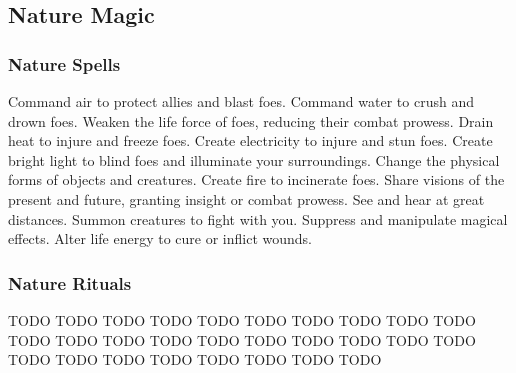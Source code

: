 \small
\subsection{Nature Magic}\label{Nature Magic}
\subsubsection{Nature Spells}\label{Nature Spells}
\begin{spelllist}
 Command air to protect allies and blast foes.
 Command water to crush and drown foes.
 Weaken the life force of foes, reducing their combat prowess.
 Drain heat to injure and freeze foes.
 Create electricity to injure and stun foes.
 Create bright light to blind foes and illuminate your surroundings.
 Change the physical forms of objects and creatures.
 Create fire to incinerate foes.
 Share visions of the present and future, granting insight or combat prowess.
 See and hear at great distances.
 Summon creatures to fight with you.
 Suppress and manipulate magical effects.
 Alter life energy to cure or inflict wounds.
\end{spelllist}

\subsubsection{Nature Rituals}\label{Nature Rituals}
\begin{spelllist}
 TODO
 TODO
 TODO
 TODO
 TODO
 TODO
 TODO
 TODO
 TODO
 TODO
 TODO
 TODO
 TODO
 TODO
 TODO
 TODO
 TODO
 TODO
 TODO
 TODO
 TODO
 TODO
 TODO
 TODO
 TODO
 TODO
 TODO
 TODO
\end{spelllist}



